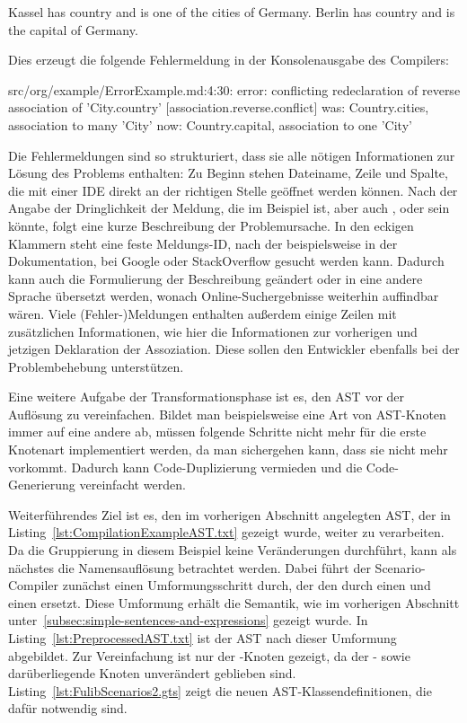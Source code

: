 \begin{codeblock}
    Kassel has country and is one of the cities of Germany.
    Berlin has country and is the capital of Germany.
\end{codeblock}

Dies erzeugt die folgende Fehlermeldung in der Konsolenausgabe des Compilers:

\begin{codeblock}
    src/org/example/ErrorExample.md:4:30: error: conflicting redeclaration of reverse association of 'City.country' [association.reverse.conflict]
    was: Country.cities, association to many 'City'
    now: Country.capital, association to one 'City'
\end{codeblock}

Die Fehlermeldungen sind so strukturiert, dass sie alle nötigen Informationen zur Lösung des Problems enthalten:
Zu Beginn stehen Dateiname, Zeile und Spalte, die mit einer IDE direkt an der richtigen Stelle geöffnet werden können.
Nach der Angabe der Dringlichkeit der Meldung, die im Beispiel  ist, aber auch ,  oder  sein könnte, folgt eine kurze Beschreibung der Problemursache.
In den eckigen Klammern steht eine feste Meldungs-ID, nach der beispielsweise in der Dokumentation, bei Google oder StackOverflow gesucht werden kann.
Dadurch kann auch die Formulierung der Beschreibung geändert oder in eine andere Sprache übersetzt werden, wonach Online-Suchergebnisse weiterhin auffindbar wären.
Viele (Fehler-)Meldungen enthalten außerdem einige Zeilen mit zusätzlichen Informationen, wie hier die Informationen zur vorherigen und jetzigen Deklaration der Assoziation.
Diese sollen den Entwickler ebenfalls bei der Problembehebung unterstützen.

Eine weitere Aufgabe der Transformationsphase ist es, den AST vor der Auflösung zu vereinfachen.
Bildet man beispielsweise eine Art von AST-Knoten immer auf eine andere ab, müssen folgende Schritte nicht mehr für die erste Knotenart implementiert werden, da man sichergehen kann, dass sie nicht mehr vorkommt.
Dadurch kann Code-Duplizierung vermieden und die Code-Generierung vereinfacht werden.

Weiterführendes Ziel ist es, den im vorherigen Abschnitt angelegten AST, der in Listing~\ref{lst:CompilationExampleAST.txt} gezeigt wurde, weiter zu verarbeiten.
Da die Gruppierung in diesem Beispiel keine Veränderungen durchführt, kann als nächstes die Namensauflösung betrachtet werden.
Dabei führt der Scenario-Compiler zunächst einen Umformungsschritt durch, der den  durch einen  und einen  ersetzt.
Diese Umformung erhält die Semantik, wie im vorherigen Abschnitt unter~\ref{subsec:simple-sentences-and-expressions} gezeigt wurde.
In Listing~\ref{lst:PreprocessedAST.txt} ist der AST nach dieser Umformung abgebildet.
Zur Vereinfachung ist nur der -Knoten gezeigt, da der - sowie darüberliegende Knoten unverändert geblieben sind.
Listing~\ref{lst:FulibScenarios2.gts} zeigt die neuen AST-Klassendefinitionen, die dafür notwendig sind.

